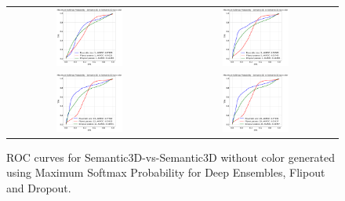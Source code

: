     \begin{figure}
        \centering
        \begin{tabular}{cc}
            \includegraphics[width = 0.42\textwidth, height= 0.3\textheight]{images/AUROC/MSP_cnc_1.pdf} & 
            \includegraphics[width = 0.42\textwidth, height= 0.3\textheight]{images/AUROC/MSP_cnc_5.pdf}\\ 
            \includegraphics[width = 0.42\textwidth, height= 0.3\textheight]{images/AUROC/MSP_cnc_15.pdf} &
            \includegraphics[width = 0.42\textwidth, height= 0.3\textheight]{images/AUROC/MSP_cnc_20.pdf} 
            \\
        \end{tabular}
        \caption{ROC curves for Semantic3D-vs-Semantic3D without color generated using Maximum Softmax Probability for Deep Ensembles, Flipout and Dropout.}
        \label{fig:roc_msp_ood_2}
    \end{figure}
